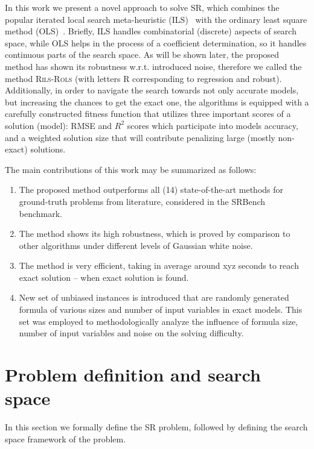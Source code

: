 \documentclass[a4paper,12pt]{elsarticle}
\begin{document}
	In this work we present a novel approach to solve SR, which combines the popular iterated local search meta-heuristic (ILS)~\cite{lourencco2003iterated,lourencco2019iterated} with the ordinary least square  method (OLS)~\cite{leng2007ordinary}. Briefly, ILS handles combinatorial (discrete) aspects of search space, while OLS helps in the process of a coefficient determination, so it handles continuous parts of the search space. As will be shown later, the proposed method has shown its robustness w.r.t. introduced noise, therefore we called the method \textsc{Rils}-\textsc{Rols}  (with letters R corresponding to regression and robust).    Additionally, in order to navigate the search towards not only accurate models, but increasing the chances to get the exact one, the algorithms is equipped with a carefully constructed fitness function that utilizes three important scores of a solution (model): RMSE and $R^2$ scores which participate into models accuracy, and a weighted solution size that will contribute penalizing large (mostly non-exact) solutions. 
	
	The main contributions of this work may be summarized as follows: 
	
	\begin{enumerate}
		\item The proposed method outperforms all (14) state-of-the-art methods for ground-truth problems from literature, considered in the SRBench benchmark.  
		
		\item The method shows its high robustness, which is proved by comparison to other algorithms under different levels of Gaussian white noise. 
		
		\item The method is very efficient, taking in average around xyz seconds to reach exact solution -- when exact solution is found. 
		
		\item New set of unbiased instances is   introduced that are randomly generated formula of various sizes and number of input variables in exact models. This set was employed to methodologically analyze the influence of formula size, number of input variables and noise on the solving difficulty. 
	\end{enumerate}
	
	
	\section{Problem definition and search space}
	\label{sec:search-space}
	In this section we formally define the SR problem, followed by defining the search space framework of the problem.  
	
\end{document}
